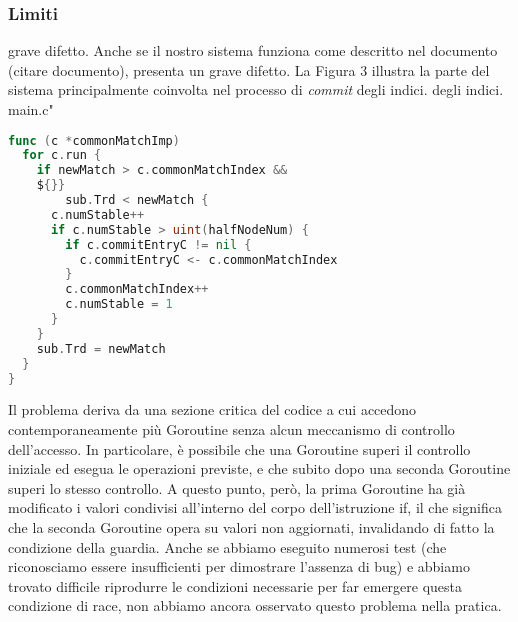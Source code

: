 \subsubsection{Limiti}
grave difetto. 
Anche se il nostro sistema funziona come descritto nel documento (citare documento), presenta un 
grave difetto. 
La Figura 3 illustra la parte del sistema principalmente coinvolta nel processo di \textit{commit} 
degli indici.
degli indici.
main.c"
\begin{lstlisting}[language=Go]
func (c *commonMatchImp) 
  for c.run { 
    if newMatch > c.commonMatchIndex && 
    ${}}
        sub.Trd < newMatch { 
      c.numStable++ 
      if c.numStable > uint(halfNodeNum) {
        if c.commitEntryC != nil {
          c.commitEntryC <- c.commonMatchIndex
        } 
        c.commonMatchIndex++
        c.numStable = 1
      } 
    } 
    sub.Trd = newMatch
  } 
}
\end{lstlisting}
Il problema deriva da una sezione critica del codice a cui accedono contemporaneamente più 
Goroutine senza alcun meccanismo di controllo dell'accesso. In particolare, è possibile che una Goroutine 
superi il controllo iniziale ed esegua le operazioni previste, e che subito dopo una seconda 
Goroutine superi lo stesso controllo. A questo punto, però, la prima Goroutine ha già modificato i 
valori condivisi all'interno del corpo dell'istruzione if, il che significa che la seconda Goroutine 
opera su valori non aggiornati, invalidando di fatto la condizione della guardia. Anche se abbiamo 
eseguito numerosi test (che riconosciamo essere insufficienti per dimostrare l'assenza di bug) e 
abbiamo trovato difficile riprodurre le condizioni necessarie per far emergere questa condizione di 
race, non abbiamo ancora osservato questo problema nella pratica.
